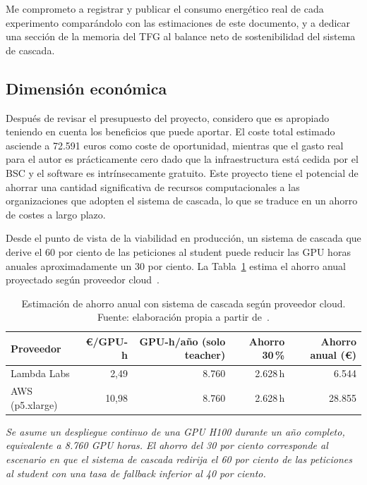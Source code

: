 \documentclass[11pt,a4paper]{article}
\begin{document}
Me comprometo a registrar y publicar el consumo energético real de cada experimento comparándolo con las estimaciones de este documento, y a dedicar una sección de la memoria del TFG al balance neto de sostenibilidad del sistema de cascada.

\subsection{Dimensión económica}

Después de revisar el presupuesto del proyecto, considero que es apropiado teniendo en cuenta los beneficios que puede aportar. El coste total estimado asciende a 72.591 euros como coste de oportunidad, mientras que el gasto real para el autor es prácticamente cero dado que la infraestructura está cedida por el BSC y el software es intrínsecamente gratuito. Este proyecto tiene el potencial de ahorrar una cantidad significativa de recursos computacionales a las organizaciones que adopten el sistema de cascada, lo que se traduce en un ahorro de costes a largo plazo.

Desde el punto de vista de la viabilidad en producción, un sistema de cascada que derive el 60 por ciento de las peticiones al student puede reducir las GPU horas anuales aproximadamente un 30 por ciento. La Tabla~\ref{tab:ahorro-cascada} estima el ahorro anual proyectado según proveedor cloud~\cite{lambda2026,aws2026}.

\begin{table}[H]
\centering
\caption{Estimación de ahorro anual con sistema de cascada según proveedor cloud. Fuente: elaboración propia a partir de~\cite{lambda2026,aws2026}.}
\label{tab:ahorro-cascada}
\footnotesize
\begin{tabular}{l r r r r}
\toprule
\textbf{Proveedor} & \textbf{\euro{}/GPU-h} & \textbf{GPU-h/año (solo teacher)} & \textbf{Ahorro 30\,\%} & \textbf{Ahorro anual (\euro{})} \\
\midrule
Lambda Labs  & 2,49  & 8.760 & 2.628\,h & 6.544 \\
AWS (p5.xlarge) & 10,98 & 8.760 & 2.628\,h & 28.855 \\
\bottomrule
\end{tabular}
\end{table}

\noindent\textit{\scriptsize Se asume un despliegue continuo de una GPU H100 durante un año completo, equivalente a 8.760 GPU horas. El ahorro del 30 por ciento corresponde al escenario en que el sistema de cascada redirija el 60 por ciento de las peticiones al student con una tasa de fallback inferior al 40 por ciento.}
\end{document}
